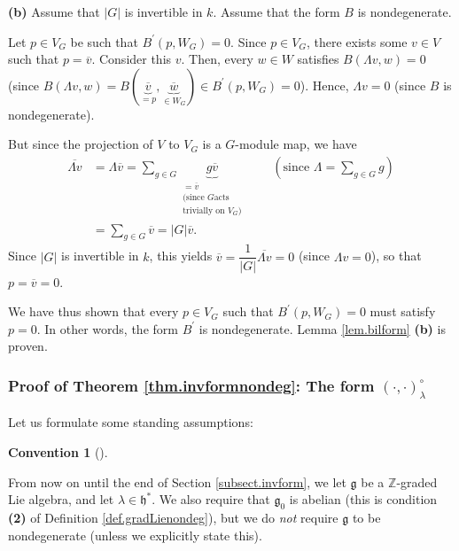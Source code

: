 \documentclass
[numbers=enddot,12pt,final,onecolumn,german,notitlepage]{scrartcl}%
\theoremstyle{definition}
\newtheorem{conv}[theo]{Convention}
\newenvironment{Convention}[1][]
{\begin{conv}[#1]\begin{leftbar}}
{\end{leftbar}\end{conv}}
\begin{document}
\textbf{(b)} Assume that $\left\vert G\right\vert $ is invertible in $k$.
Assume that the form $B$ is nondegenerate.

Let $p\in V_{G}$ be such that $B^{\prime}\left(  p,W_{G}\right)  =0$. Since
$p\in V_{G}$, there exists some $v\in V$ such that $p=\overline{v}$. Consider
this $v$. Then, every $w\in W$ satisfies $B\left(  \Lambda v,w\right)  =0$
(since $B\left(  \Lambda v,w\right)  =B\left(  \underbrace{\overline{v}}%
_{=p},\underbrace{\overline{w}}_{\in W_{G}}\right)  \in B^{\prime}\left(
p,W_{G}\right)  =0$). Hence, $\Lambda v=0$ (since $B$ is nondegenerate).

But since the projection of $V$ to $V_{G}$ is a $G$-module map, we have
\begin{align*}
\overline{\Lambda v}  &  =\Lambda\overline{v}=\sum\limits_{g\in G}%
\underbrace{g\overline{v}}_{\substack{=\overline{v}\\\text{(since }G\text{
acts}\\\text{trivially on }V_{G}\text{)}}}\ \ \ \ \ \ \ \ \ \ \left(
\text{since }\Lambda=\sum\limits_{g\in G}g\right) \\
&  =\sum\limits_{g\in G}\overline{v}=\left\vert G\right\vert \overline{v}.
\end{align*}
Since $\left\vert G\right\vert $ is invertible in $k$, this yields
$\overline{v}=\dfrac{1}{\left\vert G\right\vert }\overline{\Lambda v}=0$
(since $\Lambda v=0$), so that $p=\overline{v}=0$.

We have thus shown that every $p\in V_{G}$ such that $B^{\prime}\left(
p,W_{G}\right)  =0$ must satisfy $p=0$. In other words, the form $B^{\prime}$
is nondegenerate. Lemma \ref{lem.bilform} \textbf{(b)} is proven.

\subsubsection{Proof of Theorem \ref{thm.invformnondeg}: The form $\left(
\cdot,\cdot\right)  _{\lambda}^{\circ}$}

Let us formulate some standing assumptions:

\begin{Convention}
From now on until the end of Section \ref{subsect.invform}, we let
$\mathfrak{g}$ be a $\mathbb{Z}$-graded Lie algebra, and let $\lambda
\in\mathfrak{h}^{\ast}$. We also require that $\mathfrak{g}_{0}$ is abelian
(this is condition \textbf{(2)} of Definition \ref{def.gradLienondeg}), but we
do \textit{not} require $\mathfrak{g}$ to be nondegenerate (unless we
explicitly state this).
\end{Convention}
\end{document}

